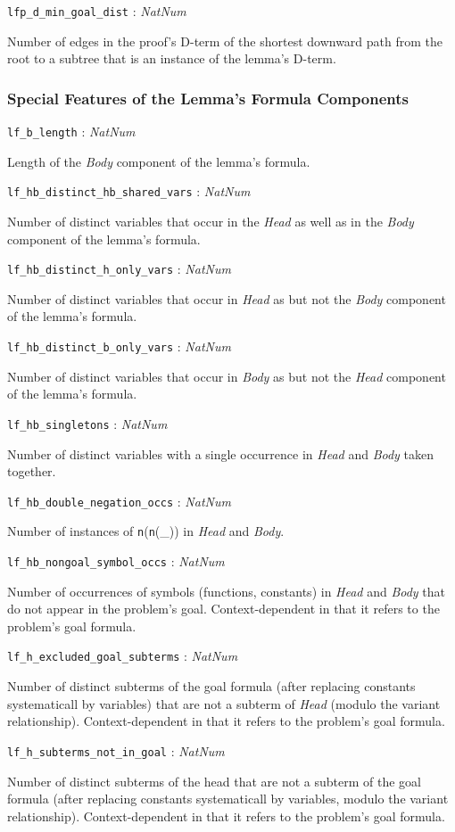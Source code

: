 \documentclass[a4paper,11pt]{article}
\newcommand{\f}[1]{\texttt{#1}}
\newcommand{\var}[1]{\textnormal{\textit{#1}}}
\newcommand{\lit}[1]{\textnormal{\textit{#1}}}
\newcommand{\propsig}[2]
{\noindent \f{#1} : #2}
\newcommand{\propdesc}[1]
{\par \hspace*{\fill}\begin{minipage}{0.9\textwidth}#1\end{minipage}\par\smallskip}
\begin{document}
\propsig{lfp\_d\_min\_goal\_dist}{\lit{NatNum}} \propdesc{Number of edges in
  the proof's D-term of the shortest downward path from the root to a subtree
  that is an instance of the lemma's D-term.}

\subsubsection{Special Features of the Lemma's Formula Components}
  
\propsig{lf\_b\_length}{\lit{NatNum}}
\propdesc{Length of the \var{Body} component of the lemma's formula.}

\propsig{lf\_hb\_distinct\_hb\_shared\_vars}{\lit{NatNum}}
  \propdesc{Number of distinct
  variables that occur in the \var{Head} as well as in the \var{Body}
  component of the lemma's formula.}

\propsig{lf\_hb\_distinct\_h\_only\_vars}{\lit{NatNum}}
\propdesc{Number of distinct variables that occur in \var{Head} as but not
  the \var{Body} component of the lemma's formula.}

\propsig{lf\_hb\_distinct\_b\_only\_vars}{\lit{NatNum}}
\propdesc{Number of distinct variables that occur in \var{Body} as but not
  the \var{Head} component of the lemma's formula.}

\propsig{lf\_hb\_singletons}{\lit{NatNum}}
\propdesc{Number of distinct variables with a single occurrence in
  \var{Head} and \var{Body} taken together.}

\propsig{lf\_hb\_double\_negation\_occs}{\lit{NatNum}}
\propdesc{Number of instances of \f{n}(\f{n}(\_)) in \var{Head} and \var{Body}.}

\propsig{lf\_hb\_nongoal\_symbol\_occs}{\lit{NatNum}}
\propdesc{Number of occurrences of symbols (functions, constants) in
  \var{Head} and \var{Body} that do not appear in the problem's goal.
  Context-dependent in that it refers to the problem's goal formula.}

\propsig{lf\_h\_excluded\_goal\_subterms}{\lit{NatNum}}
\propdesc{Number of distinct subterms of the goal formula (after replacing
  constants systematicall by variables) that are not a subterm of \var{Head}
  (modulo the variant relationship). Context-dependent in that it refers to
  the problem's goal formula.}

\propsig{lf\_h\_subterms\_not\_in\_goal}{\lit{NatNum}}
\propdesc{Number of distinct subterms of the head that are not a subterm of
  the goal formula (after replacing constants systematicall by variables,
  modulo the variant relationship). Context-dependent in that it refers to the
  problem's goal formula.}
\end{document}

